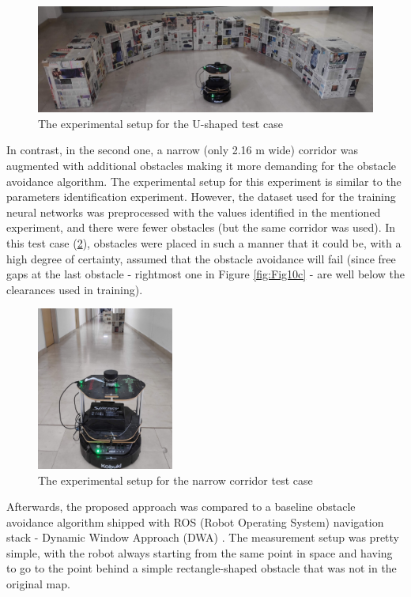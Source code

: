 \begin{figure}
    \centering
    \includegraphics[width=\textwidth]{slike/turkish/Fig09a.pdf}
    \caption{The experimental setup for the U-shaped test case}
    \label{fig:UshapeExp}
\end{figure}

In contrast, in the second one, a narrow (only 2.16 m wide) corridor was augmented with additional obstacles making it more demanding for the obstacle avoidance algorithm. The experimental setup for this experiment is similar to the parameters identification experiment. However, the dataset used for the training neural networks was preprocessed with the values identified in the mentioned experiment, and there were fewer obstacles (but the same corridor was used). In this test case (\cref{fig:CorridorExp}), obstacles were placed in such a manner that it could be, with a high degree of certainty, assumed that the obstacle avoidance will fail (since free gaps at the last obstacle - rightmost one in Figure \ref{fig:Fig10c} - are well below the clearances used in training).

\begin{figure}
    \centering
    \includegraphics[width=0.4\textwidth]{slike/turkish/Fig10a.pdf}
    \caption{The experimental setup for the narrow corridor test case}
    \label{fig:CorridorExp}
\end{figure}

Afterwards, the proposed approach was compared to a baseline obstacle avoidance algorithm shipped with ROS (Robot Operating System) \cite{Quigley2009} navigation stack - Dynamic Window Approach (DWA) \cite{Fox1997}. The measurement setup was pretty simple, with the robot always starting from the same point in space and having to go to the point behind a simple rectangle-shaped obstacle that was not in the original map.


